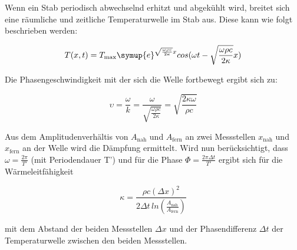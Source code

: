       \noindent Wenn ein Stab periodisch abwechselnd erhitzt und abgekühlt wird, breitet sich eine räumliche und zeitliche Temperaturwelle im Stab aus. 
      Diese kann wie folgt beschrieben werden: 

      \begin{equation}
      T(x,t) = T_\text{max} \symup{e}^{\sqrt{\frac{\omega \rho c}{2 \kappa}}x} cos(\omega t - \sqrt{\frac{\omega \rho c}{2 \kappa}} x)
        \label{eqn:temperaturwelle}
      \end{equation}  

      \noindent Die Phasengeschwindigkeit mit der sich die Welle fortbewegt ergibt sich zu:

      \begin{equation}
      \upsilon = \frac{\omega}{k} = \frac{\omega}{\sqrt{\frac{\omega \rho c}{2 \kappa}}} = \sqrt{\frac{2 \kappa \omega}{\rho c}}
        \label{eqn:phasengeschwindigkeit}
      \end{equation}

      \noindent Aus dem Amplitudenverhältis von $A_\text{nah}$ und $A_\text{fern}$ an zwei Messstellen $x_\text{nah}$ und $x_\text{fern}$ an der Welle wird die Dämpfung ermittelt.
      Wird nun berücksichtigt, dass $\omega = \frac{2 \pi}{T'}$ (mit Periodendauer T') und für die Phase $\Phi = \frac{2 \pi \Delta t}{T'}$ ergibt sich für die Wärmeleitfähigkeit

      \begin{equation}
      \kappa = \frac{\rho c (\Delta x)^2}{2 \Delta t \, ln (\frac{A_\text{nah}}{A_\text{fern}})}
        \label{eqn:waermeleitfaehigkeit}
      \end{equation}

     \noindent mit dem Abstand der beiden Messstellen $\Delta x$ und der Phasendifferenz $\Delta t$ der Temperaturwelle zwischen den beiden Messstellen.